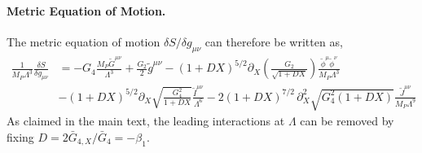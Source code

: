 \documentclass[11pt]{article}
\begin{document}
\paragraph{Metric Equation of Motion.}
The metric equation of motion $\delta S / \delta g_{\mu\nu}$ can therefore be written as,
\begin{align}
\frac{1}{ M_P \Lambda^3} \frac{\delta S}{\delta g_{\mu \nu} } &=  - G_4  \frac{ M_P  \tilde{G}^{\mu\nu} }{\Lambda^3} 
+  \frac{G_2}{2} \tilde{g}^{\mu\nu} -  ( 1 + D X )^{5/2} \partial_X \left(  \frac{ G_2 }{ \sqrt{1 + D X} }   \right)  \frac{ \tilde{\phi}^\mu \tilde{\phi}^\nu}{ M_P \Lambda^3 }  \nonumber \\ 
& - \left(1 + D X \right)^{5/2}   \partial_{ X }  \sqrt{ \frac{G_4^2 }{ 1  + D  X } }   \frac{ \tilde{I}^{\mu\nu}}{\Lambda^6}  
  - 2 (1 + D X )^{7/2} \,  \partial_{ X }^2 \sqrt{  G_4^2  \left( 1 + D  X \right) }  \frac{ \tilde{J}^{\mu\nu}}{M_P \Lambda^{9}}  
\label{eqn:metric_eom_NL}
\end{align}
As claimed in the main text, the leading interactions at $\Lambda$ can be removed by fixing $D = 2 \bar{G}_{4,X} / \bar{G}_4 = - \beta_1$. 


\end{document}

